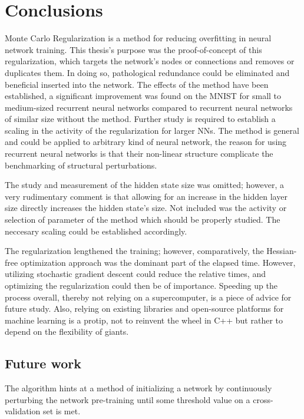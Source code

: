 \chapter{Conclusions}

Monte Carlo Regularization is a method for reducing overfitting in neural network training. This thesis's purpose was the proof-of-concept of this regularization, which targets the network's nodes or connections and removes or duplicates them. In doing so, pathological redundance could be eliminated and beneficial inserted into the network. The effects of the method have been established, a significant improvement was found on the MNIST for small to medium-sized recurrent neural networks compared to recurrent neural networks of similar size without the method. Further study is required to establish a scaling in the activity of the regularization for larger NNs. The method is general and could be applied to arbitrary kind of neural network, the reason for using recurrent neural networks is that their non-linear structure complicate the benchmarking of structural perturbations.

The study and measurement of the hidden state size was omitted; however, a very rudimentary comment is that allowing for an increase in the hidden layer size directly increases the hidden state's size. Not included was the activity or selection of parameter of the method which should be properly studied. The neccesary scaling could be established accordingly. 

The regularization lengthened the training; however, comparatively, the Hessian-free optimization approach was the dominant part of the elapsed time. However, utilizing stochastic gradient descent could reduce the relative times, and optimizing the regularization could then be of importance. Speeding up the process overall, thereby not relying on a supercomputer, is a piece of advice for future study. Also, relying on existing libraries and open-source platforms for machine learning is a protip, not to reinvent the wheel in C++ but rather to depend on the flexibility of giants.

\section{Future work}

The algorithm hints at a method of initializing a network by continuously perturbing the network pre-training until some threshold value on a cross-validation set is met. 

